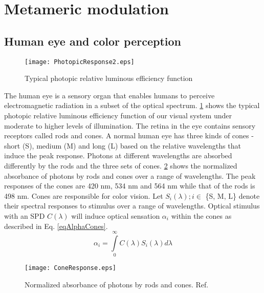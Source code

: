 \section{Metameric modulation}
\label{sec:metameric}
\graphicspath{{_MIMOColor/figures_mm/}}

\subsection{Human eye and color perception}
\label{subsec:metamericEye}
\begin{figure}[!t]
	\centering
    \texttt{[image: PhotopicResponse2.eps]}
	\caption{Typical photopic relative luminous efficiency function}
	\label{figPhotopicCurve}
\end{figure}
The human eye is a sensory organ that enables humans to perceive electromagnetic radiation in a subset of the optical spectrum. \figurename{ \ref{figPhotopicCurve}} \cite{jai89a} shows the typical photopic relative luminous efficiency function of our visual system under moderate to higher levels of illumination. The retina in the eye contains sensory receptors called rods and cones. A normal human eye has three kinds of cones - short (S), medium (M) and long (L) based on the relative wavelengths that induce the peak response. Photons at different wavelengths are absorbed differently by the rods and the three sets of cones. \figurename{ \ref{figConeResp}} \cite{wan96a} shows the normalized absorbance of photons by rods and cones over a range of wavelengths. The peak responses of the cones are 420 nm, 534 nm and 564 nm while that of the rods is 498 nm. Cones are responsible for color vision. Let $S_{i}(\lambda); i\in$ \{S, M, L\}  denote their spectral responses to stimulus over a range of wavelengths. Optical stimulus with an SPD $C(\lambda)$ will induce optical sensation $\alpha_{i}$ within the cones as described in Eq. \eqref{eqAlphaCones}.
\begin{equation}
	\label{eqAlphaCones}
	\alpha_{i} = \int\limits_{0}^{\infty} C(\lambda)S_{i}(\lambda)d\lambda
\end{equation}

\begin{figure}[!t]
	\centering
    \texttt{[image: ConeResponse.eps]}
	\caption[Normalized absorbance of photons by rods and cones]{Normalized absorbance of photons by rods and cones. Ref. \cite{wan96a}}
	\label{figConeResp}
\end{figure}

